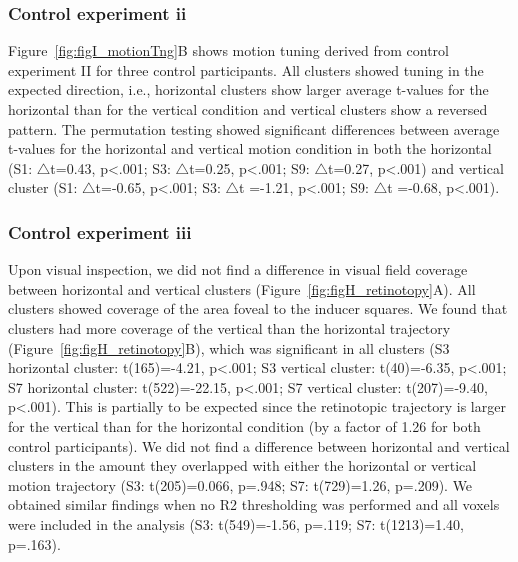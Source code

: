 \subsubsection{Control experiment ii}
Figure~\ref{fig:figI_motionTng}B shows motion tuning derived from control experiment II for three control participants. All clusters showed tuning in the expected direction, i.e., horizontal clusters show larger average t-values for the horizontal than for the vertical condition and vertical clusters show a reversed pattern. The permutation testing showed significant differences between average t-values for the horizontal and vertical motion condition in both the horizontal (S1: $\bigtriangleup$t=0.43, p\textless.001; S3: $\bigtriangleup$t=0.25, p\textless.001; S9: $\bigtriangleup$t=0.27, p\textless.001) and vertical cluster (S1: $\bigtriangleup$t=-0.65, p\textless.001; S3: $\bigtriangleup$t =-1.21, p\textless.001; S9: $\bigtriangleup$t =-0.68, p\textless.001).

\subsubsection{Control experiment iii}
Upon visual inspection, we did not find a difference in visual field coverage between horizontal and vertical clusters (Figure~\ref{fig:figH_retinotopy}A). All clusters showed coverage of the area foveal to the inducer squares. We found that clusters had more coverage of the vertical than the horizontal trajectory (Figure~\ref{fig:figH_retinotopy}B), which was significant in all clusters (S3 horizontal cluster: t(165)=-4.21, p\textless.001; S3 vertical cluster: t(40)=-6.35, p\textless.001; S7 horizontal cluster: t(522)=-22.15, p\textless.001; S7 vertical cluster: t(207)=-9.40, p\textless.001). This is partially to be expected since the retinotopic trajectory is larger for the vertical than for the horizontal condition (by a factor of 1.26 for both control participants). We did not find a difference between horizontal and vertical clusters in the amount they overlapped with either the horizontal or vertical motion trajectory (S3: t(205)=0.066, p=.948; S7: t(729)=1.26, p=.209). We obtained similar findings when no R2 thresholding was performed and all voxels were included in the analysis (S3: t(549)=-1.56, p=.119; S7: t(1213)=1.40, p=.163).

